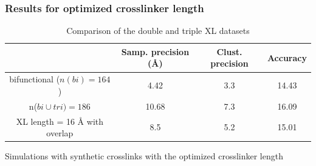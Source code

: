 \documentclass[a4paper,8pt]{beamer}
\begin{document}
%
\begin{frame}
\frametitle{Results for optimized crosslinker length}
\begin{table}
  \centering
  \caption{Comparison of the double and triple XL datasets}
  \begin{tabular}{|c|c|c|c|}
      \hline
                                   & Samp. precision ({\AA}) & Clust. precision & Accuracy\\ \hline
      bifunctional ($n(bi) = 164$) & 4.42  & 3.3 & 14.43 \\\hline
      n($bi \cup tri) = 186$       & 10.68 & 7.3 &  16.09 \\\hline
      XL length = 16 {\AA} with overlap & 8.5   & 5.2 & 15.01 \\\hline
  \end{tabular}
\end{table}
\begin{block}{}
  Simulations with synthetic crosslinks with the optimized crosslinker length
\end{block}
\end{frame}
%
\end{document}
